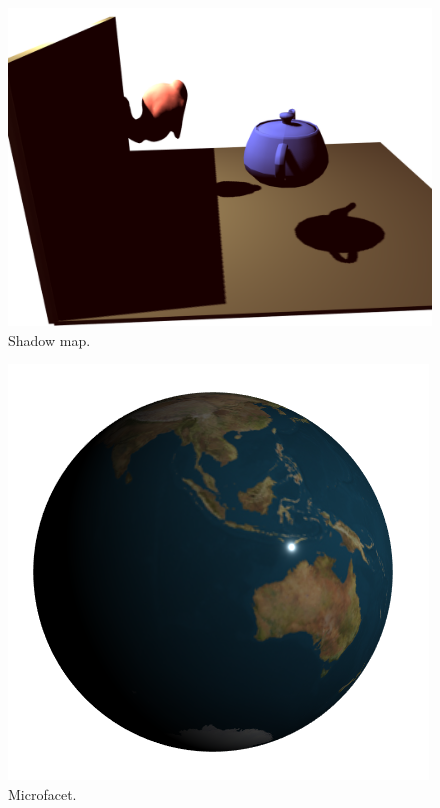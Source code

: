 \documentclass[../main.tex]{subfiles}
\begin{document}
{\begin{figure}
		\centering
		\includegraphics[width=\linewidth]{fig/shadowmap.png}
		\caption{Shadow map.}
		\label{fig:shadowmap}
\end{figure}
\begin{figure}
		\centering
		\includegraphics[width=\linewidth]{fig/microfacet.png}
		\caption{Microfacet.}
		\label{fig:microfacet}
\end{figure}

}
\end{document}
